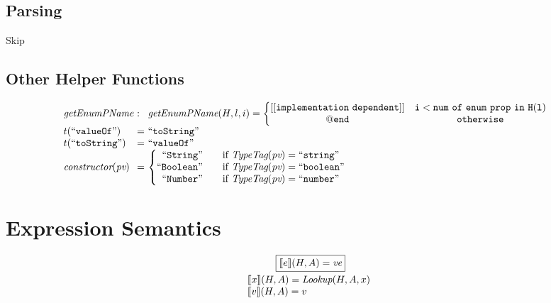 \documentclass[a4paper, leqno]{amsart}
\def\inred{\color{red}}
\newcommand{\pv}{\emph{pv}}
\newcommand{\loc}{\emph{Loc}}
\newcommand{\rulesep}{\quad\quad}
\newcommand{\sem}[1]{\ensuremath{\llbracket #1 \rrbracket}}
\newcommand{\semf}[2]{\ensuremath{\sem{#1}(#2)}}
\begin{document}
{\inred
\subsection{Parsing}
Skip
}

\subsection{Other Helper Functions}
\[
\begin{array}{l@{}l@{}ll}
\emph{getEnumPName} & \ : \ &
\emph{getEnumPName}(H,l,i) =
\left \{ \begin{matrix}
     {\tt [[implementation\ dependent]] } & {\tt i < num\ of\ enum\ prop\ in\ H(l)}\\ 
     {\tt @end } & {\tt otherwise}
     \end{matrix}\right. & \\   


t{\tt(``valueOf")} & \ = \ & {\tt ``toString" } & \\  
t{\tt(``toString")} & \ = \ & {\tt ``valueOf" } & \\  

\emph{constructor}(\pv) & \ = \ &
\left \{ \begin{matrix}
     {\tt ``String"}  \rulesep\mbox{if }\emph{TypeTag}(\pv) = {\tt ``string"} \\
     {\tt ``Boolean"} \rulesep\mbox{if }\emph{TypeTag}(\pv) = {\tt ``boolean"} \\
     {\tt ``Number"}  \rulesep\mbox{if }\emph{TypeTag}(\pv) = {\tt ``number"}
     \end{matrix}\right. & \\
\end{array}
\]

\newpage

\section{Expression Semantics}
\[
\begin{array}{l@{}l@{}ll}
\multicolumn{4}{c}{\fbox{$\semf{e}{H, A} = \emph{ve}$}} \\[.5em]
 & \  \ & \semf{x}{H, A} = \emph{Lookup}(H,A,x)& \\
 & \  \ & \semf{v}{H, A} = v& \\
\end{array}
\]
\end{document}
